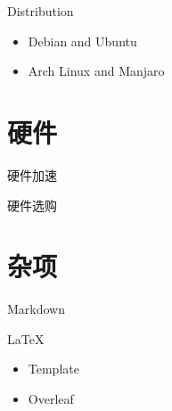 \documentclass{beamer}
\begin{document}
\begin{frame}{Distribution}
    \begin{itemize}
        \item Debian and Ubuntu
        \item Arch Linux and Manjaro
    \end{itemize}
\end{frame}

\section{硬件}

\begin{frame}{硬件加速}
    \begin{itemize}
    \end{itemize}
\end{frame}

\begin{frame}{硬件选购}
    \begin{itemize}
    \end{itemize}
\end{frame}

\section{杂项}

\begin{frame}{Markdown}
    \begin{itemize}
    \end{itemize}
\end{frame}

\begin{frame}{LaTeX}
    \begin{itemize}
        \item Template
        \item Overleaf
    \end{itemize}
\end{frame}
\end{document}

